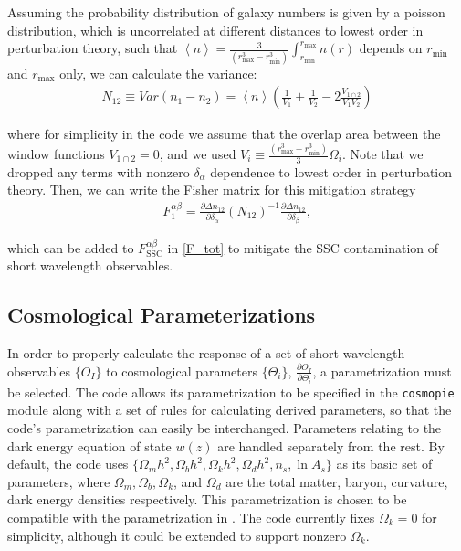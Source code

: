 \documentclass[a4paper,11pt]{article}
\begin{document}
Assuming the probability distribution of galaxy numbers is given by a poisson distribution, which is uncorrelated at different distances to lowest order in perturbation theory, such that $\left<n\right>=\frac{3}{(r_\text{max}^3-r_\text{min}^3)}\int_{r_\text{min}}^{r_\text{max}}n(r)$ depends on $r_\text{min}$ and $r_\text{max}$ only, we can calculate the variance:
\begin{align}\label{number_density_variance}
N_{12}\equiv Var\left(n_1-n_2\right) = \left<n\right>\left(\frac{1}{V_1}+\frac{1}{V_2}-2\frac{V_{1\cap 2}}{V_1 V_2}\right)
\end{align}

where for simplicity in the code we assume that the overlap area between the window functions $V_{1\cap 2}=0$, and we used $V_i \equiv \frac{(r_\text{max}^3-r_\text{min}^3)}{3}\Omega_i$. Note that we dropped any terms with nonzero $\delta_\alpha$ dependence to lowest order in perturbation theory. %
Then, we can write the Fisher matrix for this mitigation strategy
\begin{align}\label{lw_ssc}
F_1^{\alpha\beta}=\frac{\partial \Delta n_{12}}{\partial \delta_\alpha}(N_{12})^{-1}\frac{\partial \Delta n_{12}}{\partial \delta_\beta},
\end{align}

which can be added to $F_{\text{SSC}}^{\alpha\beta}$ in \eqref{F_tot} to mitigate the SSC contamination of short wavelength observables. 

\subsection{Cosmological Parameterizations}
\label{ssec:cosmo_param}
In order to properly calculate the response of a set of short wavelength observables $\{O_I\}$ to cosmological parameters $\{\Theta_i\}$, $\frac{\partial O_I}{\partial \Theta_i}$, a parametrization must be selected. The code allows its parametrization to be specified in the \texttt{cosmopie} module along with a set of rules for calculating derived parameters, so that the code's parametrization can easily be interchanged. Parameters relating to the dark energy equation of state $w(z)$ are handled separately from the rest. By default, the code uses $\{\Omega_m h^2,\Omega_b h^2,\Omega_k h^2, \Omega_d h^2, n_s,\ln{A_s}\}$ as its basic set of parameters, where $\Omega_m,\Omega_b,\Omega_k$, and $\Omega_d$ are the total matter, baryon, curvature, dark energy densities respectively. This parametrization is chosen to be compatible with the parametrization in \cite{jdem_fom}. The code currently fixes $\Omega_k=0$ for simplicity, although it could be extended to support nonzero $\Omega_k$. 
\end{document}
